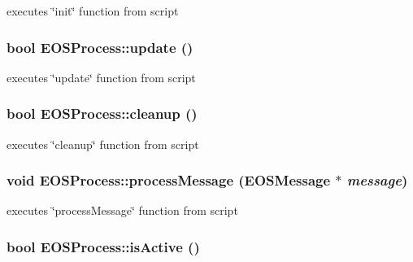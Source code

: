 executes \char`\"{}init\char`\"{} function from script 

\hypertarget{classEOSProcess_c141df99c0216969bc8b6b463f12b924}{
\subsubsection[{update}]{\setlength{\rightskip}{0pt plus 5cm}bool EOSProcess::update ()}}
\label{classEOSProcess_c141df99c0216969bc8b6b463f12b924}


executes \char`\"{}update\char`\"{} function from script 

\hypertarget{classEOSProcess_224e00ab735c33b4c5a4e58b9fe1826c}{
\subsubsection[{cleanup}]{\setlength{\rightskip}{0pt plus 5cm}bool EOSProcess::cleanup ()}}
\label{classEOSProcess_224e00ab735c33b4c5a4e58b9fe1826c}


executes \char`\"{}cleanup\char`\"{} function from script 

\hypertarget{classEOSProcess_bdaf60e60530702981c1d4ac5ceb4c3e}{
\subsubsection[{processMessage}]{\setlength{\rightskip}{0pt plus 5cm}void EOSProcess::processMessage ({\bf EOSMessage} $\ast$ {\em message})}}
\label{classEOSProcess_bdaf60e60530702981c1d4ac5ceb4c3e}


executes \char`\"{}processMessage\char`\"{} function from script 

\hypertarget{classEOSProcess_e0e33032bb4be23f342515af1a3ff911}{
\subsubsection[{isActive}]{\setlength{\rightskip}{0pt plus 5cm}bool EOSProcess::isActive ()}}
\label{classEOSProcess_e0e33032bb4be23f342515af1a3ff911}


